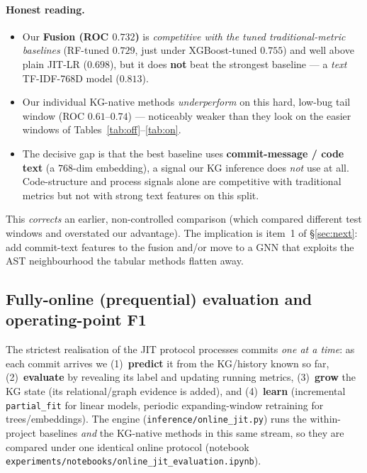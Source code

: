 \documentclass[11pt,a4paper]{article}
\newcommand{\code}[1]{\texttt{#1}}
\begin{document}
\paragraph{Honest reading.}
\begin{itemize}[nosep]
  \item Our \textbf{Fusion (ROC $0.732$)} is \emph{competitive with the tuned
        traditional-metric baselines} (RF-tuned $0.729$, just under
        XGBoost-tuned $0.755$) and well above plain JIT-LR ($0.698$), but it does
        \textbf{not} beat the strongest baseline --- a \emph{text} TF-IDF-768D
        model ($0.813$).
  \item Our individual KG-native methods \emph{underperform} on this hard,
        low-bug tail window (ROC $0.61$--$0.74$) --- noticeably weaker than they
        look on the easier windows of Tables~\ref{tab:off}--\ref{tab:on}.
  \item The decisive gap is that the best baseline uses \textbf{commit-message /
        code text} (a $768$-dim embedding), a signal our KG inference does
        \emph{not} use at all. Code-structure and process signals alone are
        competitive with traditional metrics but not with strong text features on
        this split.
\end{itemize}
This \emph{corrects} an earlier, non-controlled comparison (which compared
different test windows and overstated our advantage). The implication is item~1
of \S\ref{sec:next}: add commit-text features to the fusion and/or move to a GNN
that exploits the AST neighbourhood the tabular methods flatten away.

\subsection{Fully-online (prequential) evaluation and operating-point F1}\label{sec:onlinejit}
The strictest realisation of the JIT protocol processes commits \emph{one at a
time}: as each commit arrives we (1)~\textbf{predict} it from the KG/history
known so far, (2)~\textbf{evaluate} by revealing its label and updating running
metrics, (3)~\textbf{grow} the KG state (its relational/graph evidence is added),
and (4)~\textbf{learn} (incremental \code{partial\_fit} for linear models,
periodic expanding-window retraining for trees/embeddings). The engine
(\texttt{inference/online\_jit.py}) runs the within-project baselines \emph{and}
the KG-native methods in this same stream, so they are compared under one
identical online protocol (notebook
\texttt{experiments/notebooks/online\_jit\_evaluation.ipynb}).
\end{document}
